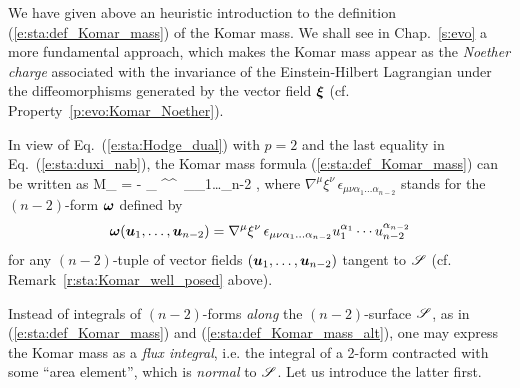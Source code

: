 \begin{remark}
We have given above an heuristic introduction
to the definition (\ref{e:sta:def_Komar_mass}) of the Komar mass. We shall see in Chap.~\ref{s:evo}
a more fundamental approach, which makes the Komar mass appear as the \emph{Noether charge} associated
with the invariance of the Einstein-Hilbert Lagrangian
under the diffeomorphisms generated by the vector field $\bm{\xi}$ (cf. Property~\ref{p:evo:Komar_Noether}).
\end{remark}

In view of Eq.~(\ref{e:sta:Hodge_dual}) with $p=2$ and the last equality in Eq.~(\ref{e:sta:duxi_nab}),
the Komar mass formula (\ref{e:sta:def_Komar_mass}) can be written as
\be \label{e:sta:def_Komar_mass_alt}
    M_{\Sp} = -   \int_{\Sp}  \nabla^\mu \xi^\nu \,
    \epsilon_{\mu\nu\alpha_1\ldots\alpha_{n-2}} ,
\ee
where $\nabla^\mu \xi^\nu \, \epsilon_{\mu\nu\alpha_1\ldots\alpha_{n-2}}$
stands for the $(n-2)$-form $\bm{\omega}$ defined by
\[
  \bm{\omega}(\bm{u}_1,\ldots,\bm{u}_{n-2}) = \nabla^\mu \xi^\nu \,
\epsilon_{\mu\nu\alpha_1\ldots\alpha_{n-2}} u_1^{\alpha_1} \cdots  u_{n-2}^{\alpha_{n-2}}
\]
for any $(n-2)$-tuple of vector fields $(\bm{u}_1,\ldots,\bm{u}_{n-2})$ tangent to $\mathscr{S}$ (cf. Remark~\ref{r:sta:Komar_well_posed} above).

Instead of integrals of $(n-2)$-forms \emph{along} the $(n-2)$-surface $\mathscr{S}$, as in (\ref{e:sta:def_Komar_mass})
and (\ref{e:sta:def_Komar_mass_alt}), one may
express the Komar mass as a \emph{flux integral}, i.e. the integral of a 2-form
contracted with some ``area element'', which is \emph{normal} to $\mathscr{S}$.
Let us introduce the latter first.

